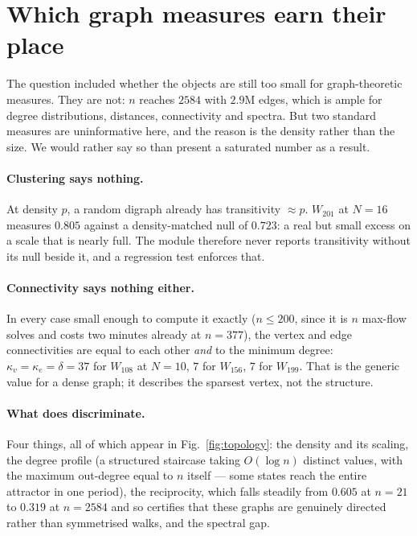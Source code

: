 \documentclass[11pt]{article}
\theoremstyle{plain}
\begin{document}
\section{Which graph measures earn their place}

The question included whether the objects are still too small for
graph-theoretic measures. They are not: $n$ reaches $2584$ with $2.9$M edges,
which is ample for degree distributions, distances, connectivity and spectra.
But two standard measures are uninformative here, and the reason is the density
rather than the size. We would rather say so than present a saturated number as
a result.

\paragraph{Clustering says nothing.} At density $p$, a random digraph already has
transitivity $\approx p$. $W_{201}$ at $N=16$ measures $0.805$ against a
density-matched null of $0.723$: a real but small excess on a scale that is
nearly full. The module therefore never reports transitivity without its null
beside it, and a regression test enforces that.

\paragraph{Connectivity says nothing either.} In every case small enough to
compute it exactly ($n\le200$, since it is $n$ max-flow solves and costs two
minutes already at $n=377$), the vertex and edge connectivities are equal to
each other \emph{and} to the minimum degree: $\kappa_v=\kappa_e=\delta=37$ for
$W_{108}$ at $N=10$, $7$ for $W_{156}$, $7$ for $W_{199}$. That is the generic
value for a dense graph; it describes the sparsest vertex, not the structure.

\paragraph{What does discriminate.} Four things, all of which appear in
Fig.~\ref{fig:topology}: the density and its scaling, the degree profile (a
structured staircase taking $O(\log n)$ distinct values, with the maximum
out-degree equal to $n$ itself --- some states reach the entire attractor in one
period), the reciprocity, which falls steadily from $0.605$ at $n=21$ to $0.319$
at $n=2584$ and so certifies that these graphs are genuinely directed rather
than symmetrised walks, and the spectral gap.
\end{document}
